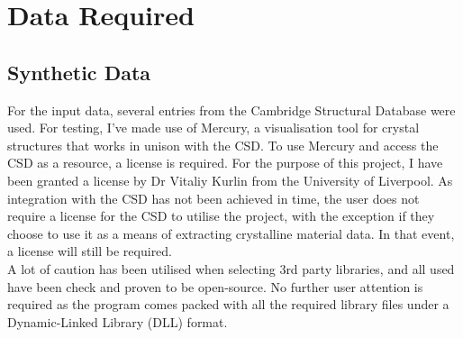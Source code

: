 \chapter{Data Required}
\label{ch:data-required}

\section{Synthetic Data}

For the input data, several entries from the Cambridge Structural Database
were used. For testing, I’ve made use of Mercury, a visualisation tool for
crystal structures that works in unison with the CSD. To use Mercury and
access the CSD as a resource, a license is required. For the purpose of this
project, I have been granted a license by Dr Vitaliy Kurlin from the University
of Liverpool. As integration with the CSD has not been achieved in time, the
user does not require a license for the CSD to utilise the project, with the
exception if they choose to use it as a means of extracting crystalline material
data. In that event, a license will still be required. \\
A lot of caution has been utilised when selecting 3rd party libraries, and
all used have been check and proven to be open-source. No further user
attention is required as the program comes packed with all the required
library files under a Dynamic-Linked Library (DLL) format. \\
